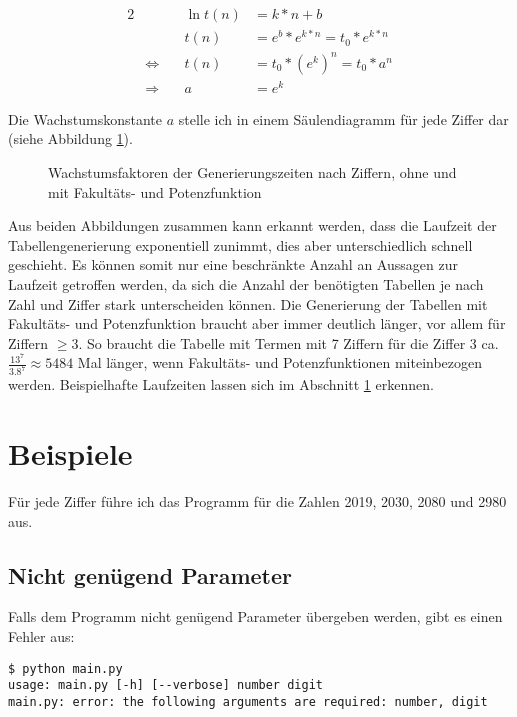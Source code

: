 \documentclass[a4paper,10pt,ngerman]{scrartcl}
\begin{document}
\begin{alignat*}{2}
  & & \ln{t(n)} &= k*n + b \\
  & & t(n) &= e^b * e^{k*n} = t_0 * e^{k*n} \\
  &\Leftrightarrow \quad& t(n) &= t_0 * (e^k)^n = t_0 * a^n \\
  &\Rightarrow \quad& a &= e^k
\end{alignat*}

Die Wachstumskonstante $a$ stelle ich in einem Säulendiagramm für jede Ziffer dar (siehe Abbildung \ref{fig:implementation:runtime:2}).

\begin{figure}
  \centering
  
  \caption{Wachstumsfaktoren der Generierungszeiten nach Ziffern, ohne und mit Fakultäts- und Potenzfunktion}
  \label{fig:implementation:runtime:2}
\end{figure}

Aus beiden Abbildungen zusammen kann erkannt werden, dass die Laufzeit der Tabellengenerierung exponentiell zunimmt, dies aber unterschiedlich schnell geschieht.
Es können somit nur eine beschränkte Anzahl an Aussagen zur Laufzeit getroffen werden, da sich die Anzahl der benötigten Tabellen je nach Zahl und Ziffer stark unterscheiden können.
Die Generierung der Tabellen mit Fakultäts- und Potenzfunktion braucht aber immer deutlich länger, vor allem für Ziffern $\ge 3$.
So braucht die Tabelle mit Termen mit 7 Ziffern für die Ziffer 3 ca. $\frac{13^7}{3.8^7} \approx 5484$ Mal länger, wenn Fakultäts- und Potenzfunktionen miteinbezogen werden.
Beispielhafte Laufzeiten lassen sich im Abschnitt \ref{sec:examples} erkennen.

\section{Beispiele}
\label{sec:examples}
Für jede Ziffer führe ich das Programm für die Zahlen 2019, 2030, 2080 und 2980 aus.


\subsection{Nicht genügend Parameter}
Falls dem Programm nicht genügend Parameter übergeben werden, gibt es einen Fehler aus:
\begin{lstlisting}
$ python main.py 
usage: main.py [-h] [--verbose] number digit
main.py: error: the following arguments are required: number, digit
\end{lstlisting}
\end{document}
